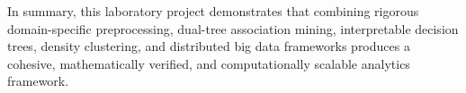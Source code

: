 \documentclass[10pt,journal]{IEEEtran}
\begin{document}
In summary, this laboratory project demonstrates that combining rigorous domain-specific preprocessing, dual-tree association mining, interpretable decision trees, density clustering, and distributed big data frameworks produces a cohesive, mathematically verified, and computationally scalable analytics framework.
\end{document}
